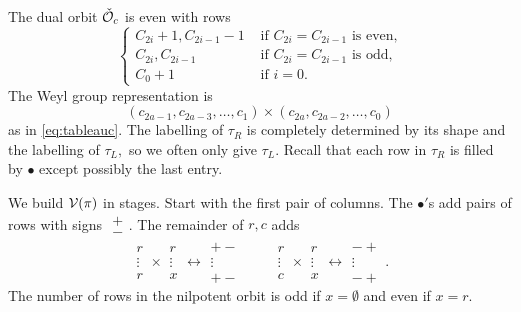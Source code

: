 \documentclass[11pt ,reqno]{amsart}
\begin{document}
The dual orbit ${\check {\mathcal O}_c}$ is even with rows  
\begin{equation}
  \begin{cases}
    C_{2i}+1,C_{2i-1}-1 &\text{ if } C_{2i}=C_{2i-1} \text{ is even,}\\
   C_{2i},C_{2i-1} &\text{ if } C_{2i}=C_{2i-1} \text{ is odd,}\\
   C_0+1 & \text{ if } i=0.
  \end{cases}
\label{3.2.1}\end{equation}
The Weyl group representation is
\begin{equation}
(c_{2a-1},c_{2a-3},\dots, c_{1})\times (c_{2a},c_{2a-2},\dots ,c_{0})
\end{equation}
as in \eqref{eq:tableauc}.
The labelling of $\tau_R$ is completely determined by
its shape and the labelling of $\tau_L,$ so we often only give
$\tau_L$. Recall that each row in $\tau_R$ is filled by $\bullet$
except possibly the last entry.


\bigskip
We  build ${\mathcal V}(\pi)$ in stages. Start with the first pair of columns. The $\bullet'$s add pairs of rows with signs $\begin{matrix}  +\\-\end{matrix}$. The remainder of $r,c$ adds
\begin{equation}
\begin{matrix} r\\ \vdots\\ r\end{matrix} \times \begin{matrix} r\\ \vdots\\ x\end{matrix}
\leftrightarrow \begin{matrix} +-\\ \vdots \\ +-\end{matrix}\qquad
\begin{matrix} r\\ \vdots\\ c\end{matrix} \times \begin{matrix} r\\ \vdots\\ x\end{matrix}
\leftrightarrow \begin{matrix} -+\\ \vdots \\ -+\end{matrix}.
\label{3.2.5}\end{equation}
The number of rows in the nilpotent orbit is odd if $x=\emptyset$ and
even if $x=r.$  
\end{document}
